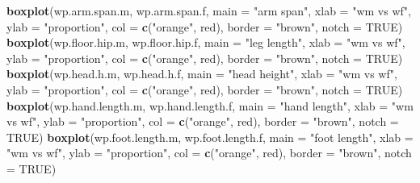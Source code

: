 \documentclass[]{article}
\newenvironment{Shaded}{\begin{snugshade}}{\end{snugshade}}
\newcommand{\DataTypeTok}[1]{\textcolor[rgb]{0.13,0.29,0.53}{#1}}
\newcommand{\KeywordTok}[1]{\textcolor[rgb]{0.13,0.29,0.53}{\textbf{#1}}}
\newcommand{\NormalTok}[1]{#1}
\newcommand{\OtherTok}[1]{\textcolor[rgb]{0.56,0.35,0.01}{#1}}
\newcommand{\StringTok}[1]{\textcolor[rgb]{0.31,0.60,0.02}{#1}}
\begin{document}
\begin{Shaded}
\begin{Highlighting}[]
\KeywordTok{boxplot}\NormalTok{(wp.arm.span.m, wp.arm.span.f,}
        \DataTypeTok{main =} \StringTok{"arm span"}\NormalTok{,}
        \DataTypeTok{xlab =} \StringTok{"wm vs wf"}\NormalTok{,}
        \DataTypeTok{ylab =} \StringTok{"proportion"}\NormalTok{,}
        \DataTypeTok{col =} \KeywordTok{c}\NormalTok{(}\StringTok{"orange"}\NormalTok{, }\StringTok{\textquotesingle{}red\textquotesingle{}}\NormalTok{),}
        \DataTypeTok{border =} \StringTok{"brown"}\NormalTok{,}
        \DataTypeTok{notch =} \OtherTok{TRUE}\NormalTok{)}
\KeywordTok{boxplot}\NormalTok{(wp.floor.hip.m, wp.floor.hip.f,}
        \DataTypeTok{main =} \StringTok{"leg length"}\NormalTok{,}
        \DataTypeTok{xlab =} \StringTok{"wm vs wf"}\NormalTok{,}
        \DataTypeTok{ylab =} \StringTok{"proportion"}\NormalTok{,}
        \DataTypeTok{col =} \KeywordTok{c}\NormalTok{(}\StringTok{"orange"}\NormalTok{, }\StringTok{\textquotesingle{}red\textquotesingle{}}\NormalTok{),}
        \DataTypeTok{border =} \StringTok{"brown"}\NormalTok{,}
        \DataTypeTok{notch =} \OtherTok{TRUE}\NormalTok{)}
\KeywordTok{boxplot}\NormalTok{(wp.head.h.m, wp.head.h.f,}
        \DataTypeTok{main =} \StringTok{"head height"}\NormalTok{,}
        \DataTypeTok{xlab =} \StringTok{"wm vs wf"}\NormalTok{,}
        \DataTypeTok{ylab =} \StringTok{"proportion"}\NormalTok{,}
        \DataTypeTok{col =} \KeywordTok{c}\NormalTok{(}\StringTok{"orange"}\NormalTok{, }\StringTok{\textquotesingle{}red\textquotesingle{}}\NormalTok{),}
        \DataTypeTok{border =} \StringTok{"brown"}\NormalTok{,}
        \DataTypeTok{notch =} \OtherTok{TRUE}\NormalTok{)}
\KeywordTok{boxplot}\NormalTok{(wp.hand.length.m, wp.hand.length.f,}
        \DataTypeTok{main =} \StringTok{"hand length"}\NormalTok{,}
        \DataTypeTok{xlab =} \StringTok{"wm vs wf"}\NormalTok{,}
        \DataTypeTok{ylab =} \StringTok{"proportion"}\NormalTok{,}
        \DataTypeTok{col =} \KeywordTok{c}\NormalTok{(}\StringTok{"orange"}\NormalTok{, }\StringTok{\textquotesingle{}red\textquotesingle{}}\NormalTok{),}
        \DataTypeTok{border =} \StringTok{"brown"}\NormalTok{,}
        \DataTypeTok{notch =} \OtherTok{TRUE}\NormalTok{)}
\KeywordTok{boxplot}\NormalTok{(wp.foot.length.m, wp.foot.length.f,}
        \DataTypeTok{main =} \StringTok{"foot length"}\NormalTok{,}
        \DataTypeTok{xlab =} \StringTok{"wm vs wf"}\NormalTok{,}
        \DataTypeTok{ylab =} \StringTok{"proportion"}\NormalTok{,}
        \DataTypeTok{col =} \KeywordTok{c}\NormalTok{(}\StringTok{"orange"}\NormalTok{, }\StringTok{\textquotesingle{}red\textquotesingle{}}\NormalTok{),}
        \DataTypeTok{border =} \StringTok{"brown"}\NormalTok{,}
        \DataTypeTok{notch =} \OtherTok{TRUE}\NormalTok{)}
\end{Highlighting}
\end{Shaded}
\end{document}
